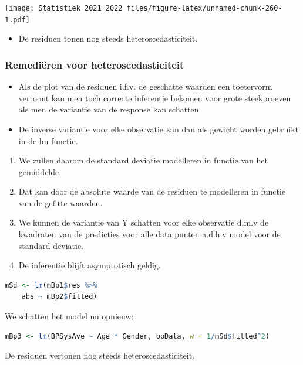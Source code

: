 \documentclass[
  12pt,dutch,coursenotes]{book}
\providecommand{\tightlist}{%
  \setlength{\itemsep}{0pt}\setlength{\parskip}{0pt}}
\theoremstyle{definition}
\theoremstyle{definition}
\theoremstyle{definition}
\theoremstyle{definition}
\theoremstyle{remark}
\begin{document}
\texttt{[image: Statistiek\_2021\_2022\_files/figure-latex/unnamed-chunk-260-1.pdf]}

\begin{itemize}
\tightlist
\item
  De residuen tonen nog steeds heteroscedasticiteit.
\end{itemize}

\hypertarget{remediuxebren-voor-heteroscedasticiteit}{%
\subsubsection{Remediëren voor heteroscedasticiteit}\label{remediuxebren-voor-heteroscedasticiteit}}

\begin{itemize}
\tightlist
\item
  Als de plot van de residuen i.f.v. de geschatte waarden een toetervorm vertoont kan men toch correcte inferentie bekomen voor grote steekproeven als men de variantie van de response kan schatten.
\item
  De inverse variantie voor elke observatie kan dan als gewicht worden gebruikt in de lm functie.
\end{itemize}

\begin{enumerate}
\def\labelenumi{\arabic{enumi}.}
\tightlist
\item
  We zullen daarom de standard deviatie modelleren in functie van het gemiddelde.
\item
  Dat kan door de absolute waarde van de residuen te modelleren in functie van de gefitte waarden.
\item
  We kunnen de variantie van Y schatten voor elke observatie d.m.v de kwadraten van de predicties voor alle data punten a.d.h.v model voor de standard deviatie.
\item
  De inferentie blijft asymptotisch geldig.
\end{enumerate}

\begin{lstlisting}[language=R]
mSd <- lm(mBp1$res %>%
    abs ~ mBp2$fitted)
\end{lstlisting}

We schatten het model nu opnieuw:

\begin{lstlisting}[language=R]
mBp3 <- lm(BPSysAve ~ Age * Gender, bpData, w = 1/mSd$fitted^2)
\end{lstlisting}

De residuen vertonen nog steeds heteroscedasticiteit.
\end{document}
